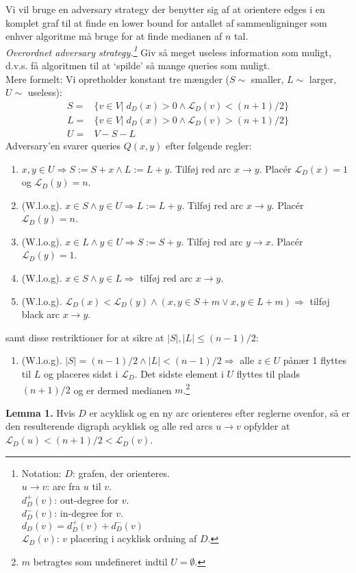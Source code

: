 Vi vil bruge en adversary strategy der benytter sig af at orientere edges i en komplet graf til at finde en lower bound for antallet af sammenligninger som enhver algoritme må bruge for at finde medianen af $n$ tal. \\

\textit{Overordnet adversary strategy.\footnote{Notation: $D$: grafen, der orienteres. \\ $u\rightarrow v$: arc fra $u$ til $v$. \\ $d_D^+(v)$: out-degree for $v$. \\ $d_D^-(v)$: in-degree for $v$. \\ $d_D(v)=d_D^+(v) + d_D^-(v)$ \\ $\mathcal{L}_D(v)$: $v$ placering i acyklisk ordning af $D$.}} Giv så meget useless information som muligt, d.v.s. få algoritmen til at `spilde' så mange queries som muligt. \\

Mere formelt: Vi opretholder konstant tre mængder ($S \sim$ smaller, $L \sim$ larger, $U \sim$ useless): 
\begin{align*}
	S =& \{v \in V| \; d_D(x)>0 \wedge\mathcal{L}_D(v)<(n+1)/2\} \\
	L =& \{v \in V| \; d_D(x)>0 \wedge\mathcal{L}_D(v)>(n+1)/2\} \\
	U =& V-S-L
\end{align*}
Adversary'en svarer queries $Q(x,y)$ efter følgende regler: 
\begin{enumerate}
	\item $x,y \in U \Longrightarrow S := S+x \wedge L := L+y$. Tilføj red arc $x \rightarrow y$. Placér $\mathcal{L}_D(x)=1$ og $\mathcal{L}_D(y)=n$. 
	\item (W.l.o.g). $x \in S \wedge y \in U \Longrightarrow L := L+y$. Tilføj red arc $x \rightarrow y$. Placér $\mathcal{L}_D(y)=n$.
	\item (W.l.o.g). $x \in L \wedge y \in U \Longrightarrow S := S+y$. Tilføj red arc $y \rightarrow x$. Placér $\mathcal{L}_D(y)=1$.
	\item (W.l.o.g). $x \in S \wedge y \in L \Longrightarrow$ tilføj red arc $x \rightarrow y$. 
	\item (W.l.o.g). $\mathcal{L}_D(x)<\mathcal{L}_D(y) \wedge(x,y \in S+m \vee x,y \in L+m) \Longrightarrow$ tilføj black arc $x \rightarrow y$. 
\end{enumerate}
samt disse restriktioner for at sikre at $|S|,|L|\le (n-1)/2$:
\begin{enumerate}
	\item (W.l.o.g). $|S|=(n-1)/2 \wedge |L|<(n-1)/2 \Longrightarrow$ alle $z \in U$ pånær 1 flyttes til $L$ og placeres sidst i $\mathcal{L}_D$. Det sidste element i $U$ flyttes til plads $(n+1)/2$ og er dermed medianen $m$.\footnote{$m$ betragtes som undefineret indtil $U = \emptyset$.}  
\end{enumerate}
\textbf{Lemma 1.} Hvis $D$ er acyklisk og en ny arc orienteres efter reglerne ovenfor, så er den resulterende digraph acyklisk og alle red arcs $u \rightarrow v$ opfylder at $\mathcal{L}_D(u)<(n+1)/2<\mathcal{L}_D(v)$. \\

